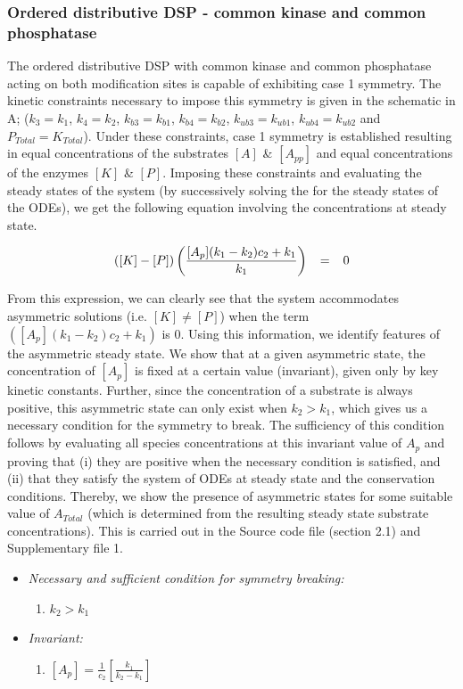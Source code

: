 \documentclass[9pt,lineno]{elife}
\begin{document}
\begin{appendixbox}
\subsubsection*{Ordered distributive DSP - common kinase and common phosphatase} 
The ordered distributive DSP with common kinase and common phosphatase acting on both modification sites is capable of exhibiting case 1 symmetry. The kinetic constraints necessary to impose this symmetry is given in the schematic in A; ($k_3 = k_1$, $k_4 = k_2$, $k_{b3} = k_{b1}$, $k_{b4} = k_{b2}$, $k_{ub3} = k_{ub1}$, $k_{ub4} = k_{ub2}$ and $P_{Total} = K_{Total}$). Under these constraints, case 1 symmetry is established resulting in equal concentrations of the substrates $[A]$ \& $[A_{pp}]$ and equal concentrations of the  enzymes $[K]$ \& $[P]$. Imposing these constraints and evaluating the steady states of the system (by successively solving the for the steady states of the ODEs), we get the following equation involving the concentrations at steady state.

\begin{equation}
\scriptsize{
 ([K]-[P])\left(\frac{[A_p](k_1-k_2)c_2+k_1}{k_1}\right) \quad = \quad 0}
\end{equation}

From this expression, we can clearly see that the system accommodates asymmetric solutions (i.e. $[K] \neq [P]$) when the term $ ([A_p](k_1-k_2)c_2+k_1) $ is $0$. Using this information, we identify features of the asymmetric steady state. We show that at a given asymmetric state, the concentration of $[A_p]$ is fixed at a certain value (invariant), given only by key kinetic constants. Further, since the concentration of a substrate is always positive, this asymmetric state can only exist when $k_2 > k_1$, which gives us a necessary condition for the symmetry to break. The sufficiency of this condition follows by evaluating all species concentrations at this invariant value of $A_p$ and proving that (i) they are positive when the necessary condition is satisfied, and (ii) that they satisfy the system of ODEs at steady state and the conservation conditions. Thereby,  we show the presence of asymmetric states
for some suitable value of $A_{Total}$ (which is determined from the resulting steady state substrate concentrations). This is carried out in the Source code file (section 2.1) and Supplementary file 1.

\begin{itemize}
    \item \textit{Necessary and sufficient condition for symmetry breaking:}
    \begin{enumerate}
        \item $k_2 > k_1$
    \end{enumerate}
        \item \textit{Invariant:} 
    \begin{enumerate}
        \item $[A_p] = \frac{1}{c_2}\left[\frac{k_1}{k_2-k_1}\right]$
    \end{enumerate}
\end{itemize}


\end{appendixbox}
\end{document}
